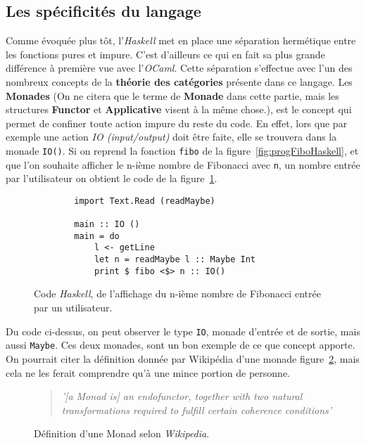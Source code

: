 \subsection{Les spécificités du langage}

Comme évoquée plus tôt, l'\textit{Haskell} met en place une séparation 
hermétique entre les fonctions pures et impure. C'est d'ailleurs ce qui en fait 
sa plus grande différence à première vue avec l'\textit{OCaml}. Cette séparation
s'effectue avec l'un des nombreux concepts de la \textbf{théorie des catégories}
présente dans ce langage. Les \textbf{Monades} (On ne citera que le terme de 
\textbf{Monade} dans cette partie, mais les structures \textbf{Functor} et 
\textbf{Applicative} visent à la même chose.), est le concept qui permet de 
confiner toute action impure du reste du code. En effet, lors que par exemple 
une action \textit{IO (input/output)} doit être faite, elle se trouvera dans la 
monade \texttt{IO()}. Si on reprend la fonction 
\texttt{fibo} de la figure~\ref{fig:progFiboHaskell}, et que l'on 
souhaite afficher le n-ième nombre de Fibonacci avec \texttt{n}, un 
nombre entrée par l'utilisateur on obtient le code de la 
figure~\ref{fig:progInOutFibo}.

\begin{figure}[H]
    \begin{verbatim}
        import Text.Read (readMaybe)
        
        main :: IO ()
        main = do
            l <- getLine
            let n = readMaybe l :: Maybe Int
            print $ fibo <$> n :: IO()
    \end{verbatim}
    \caption{
        Code \textit{Haskell}, de l'affichage du n-ième nombre de Fibonacci
        entrée par un utilisateur.
    }\label{fig:progInOutFibo}
\end{figure}

Du code ci-dessus, on peut observer le type \texttt{IO}, monade 
d'entrée et de sortie, mais aussi \texttt{Maybe}. Ces deux monades,
sont un bon exemple de ce que concept apporte. On pourrait citer la définition 
donnée par Wikipédia d'une monade figure~\ref{fig:citationMonad}, mais cela ne 
les ferait comprendre qu'à une mince portion de personne.

\begin{figure}[H]
    \begin{quotation}
        \textit{'[a Monad is] an endofunctor, together with two natural 
        transformations required to fulfill certain coherence conditions'
        }\cite{citationMonadWiki}
    \caption{
      Définition d'une Monad selon \textit{Wikipedia}.
    }\label{fig:citationMonad}
    \end{quotation}
\end{figure}

